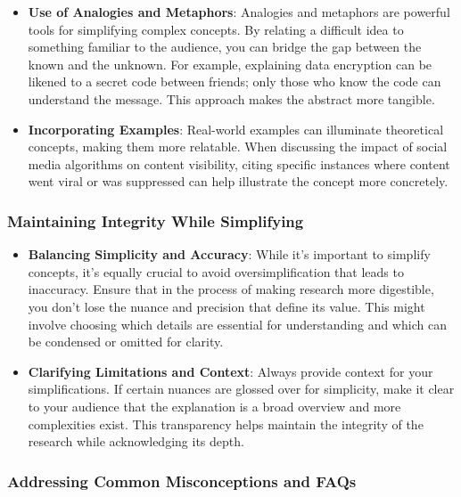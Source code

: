 \documentclass[
]{book}
\begin{document}
\begin{itemize}
\item
  \textbf{Use of Analogies and Metaphors}: Analogies and metaphors are powerful tools for simplifying complex concepts. By relating a difficult idea to something familiar to the audience, you can bridge the gap between the known and the unknown. For example, explaining data encryption can be likened to a secret code between friends; only those who know the code can understand the message. This approach makes the abstract more tangible.
\item
  \textbf{Incorporating Examples}: Real-world examples can illuminate theoretical concepts, making them more relatable. When discussing the impact of social media algorithms on content visibility, citing specific instances where content went viral or was suppressed can help illustrate the concept more concretely.
\end{itemize}

\hypertarget{maintaining-integrity-while-simplifying}{%
\subsubsection{Maintaining Integrity While Simplifying}\label{maintaining-integrity-while-simplifying}}

\begin{itemize}
\item
  \textbf{Balancing Simplicity and Accuracy}: While it's important to simplify concepts, it's equally crucial to avoid oversimplification that leads to inaccuracy. Ensure that in the process of making research more digestible, you don't lose the nuance and precision that define its value. This might involve choosing which details are essential for understanding and which can be condensed or omitted for clarity.
\item
  \textbf{Clarifying Limitations and Context}: Always provide context for your simplifications. If certain nuances are glossed over for simplicity, make it clear to your audience that the explanation is a broad overview and more complexities exist. This transparency helps maintain the integrity of the research while acknowledging its depth.
\end{itemize}

\hypertarget{addressing-common-misconceptions-and-faqs}{%
\subsubsection{Addressing Common Misconceptions and FAQs}\label{addressing-common-misconceptions-and-faqs}}
\end{document}
